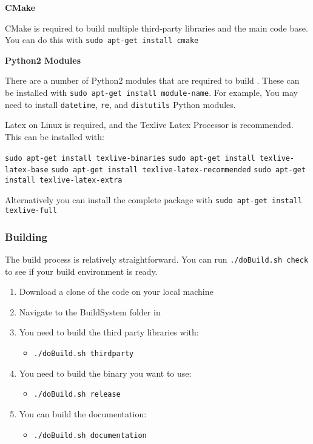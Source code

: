 \textbf{CMake}

CMake is required to build multiple third-party libraries and the main code base. You can do this with \texttt{sudo apt-get install cmake}

\textbf{Python2 Modules}

There are a number of Python2 modules that are required to build \CNAME. These can be installed with \texttt{sudo apt-get install \texttt{module-name}}. For example, You may need to install \texttt{datetime}, \texttt{re}, and \texttt{distutils} Python modules. 

Latex on Linux is required, and the Texlive Latex Processor is recommended. This can be installed with:

\texttt{sudo apt-get install texlive-binaries}
\texttt{sudo apt-get install texlive-latex-base}
\texttt{sudo apt-get install texlive-latex-recommended}
\texttt{sudo apt-get install texlive-latex-extra}

Alternatively you can install the complete package with 
\texttt{sudo apt-get install texlive-full}

\subsubsection{Building \CNAME}

The build process is relatively straightforward. You can run \texttt{./doBuild.sh check} to see if your build environment is ready.

\begin{enumerate}
	\item Download a clone of the code on your local machine
	\item Navigate to the BuildSystem folder in 
	\item You need to build the third party libraries with:
	\begin{itemize}
	    \item \texttt{./doBuild.sh thirdparty}
	\end{itemize}
	\item You need to build the binary you want to use:
	\begin{itemize}
		\item \texttt{./doBuild.sh release}
	\end{itemize}
	\item You can build the documentation:
	\begin{itemize}
		\item \texttt{./doBuild.sh documentation}
	\end{itemize}
\end{enumerate}

